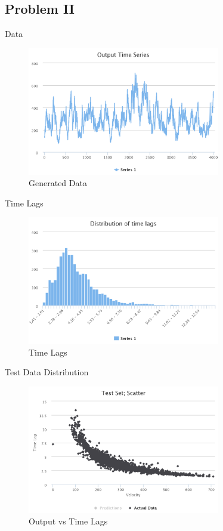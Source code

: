 \documentclass{beamer}
\begin{document}
\subsection{Problem II}
\begin{frame}{Data}
    \begin{figure}[h]
        \includegraphics[width=0.75\textwidth]{timeseries-problem-ii.png}
        \caption{Generated Data}
        \label{fig:TimeSeries-ii}
      \end{figure}
\end{frame}

\begin{frame}{Time Lags}
    \begin{figure}[h]
        \includegraphics[width=0.75\textwidth]{data-hist-problem-ii.png}
        \caption{Time Lags}
        \label{fig:TimeLags-ii}
      \end{figure}
\end{frame}

\begin{frame}{Test Data Distribution}
    \begin{figure}[h]
        \includegraphics[width=0.75\textwidth]{data-scatter-ii.png}
        \caption{Output vs Time Lags}
        \label{fig:VelTimeLags-ii}
      \end{figure}
\end{frame}
\end{document}
